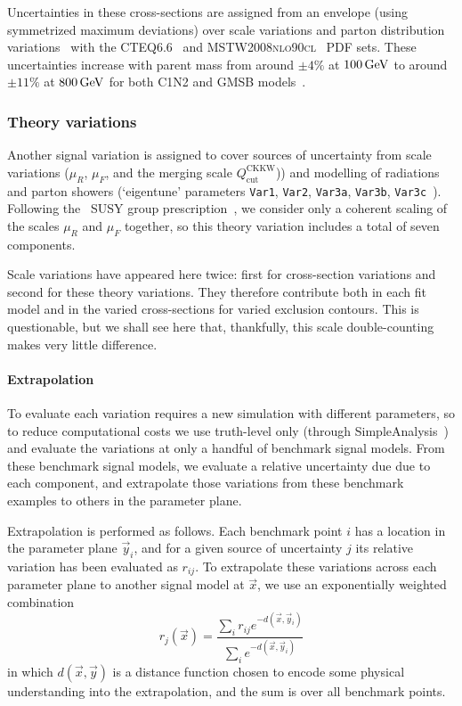 Uncertainties in these cross-sections are assigned from an envelope
(using symmetrized maximum deviations)
over scale variations and parton distribution variations~\cite{Fuks:2012qx}
with the
\textsc{CTEQ6.6}~\cite{Nadolsky:2008cw} and
\textsc{MSTW2008nlo90cl}~\cite{Martin:2009iq} PDF sets.
These uncertainties increase with parent mass from around
$\pm4\%$ at $100\,\eV[G]$ to around
$\pm11\%$ at $800\,\eV[G]$ for both C1N2 and GMSB models~\cite{
atlas_twiki_xsec_c1n2,
atlas_twiki_xsec_hino
}.

\subsubsection{Theory variations}
\label{sec:2ljets_theory_variations}
Another signal variation is assigned to cover sources of uncertainty from
scale variations ($\mu_R$, $\mu_F$, and the merging scale
$Q_\textrm{cut}^\textrm{CKKW}$)) and modelling of radiations and parton
showers (`eigentune' parameters
\texttt{Var1},
\texttt{Var2},
\texttt{Var3a},
\texttt{Var3b},
\texttt{Var3c}~\cite{ATL-PHYS-PUB-2014-021}).
Following the \atlas\ SUSY group
prescription~\cite{atlas_twiki_susytheoretical},
we consider only a coherent scaling of the scales $\mu_R$ and $\mu_F$ together,
so this theory variation includes a total of seven components.

Scale variations have appeared here twice:
first for cross-section variations and
second for these theory variations.
They therefore contribute both in each fit model and in the varied
cross-sections for varied exclusion contours.
This is questionable, but we shall see here that, thankfully, this scale
double-counting makes very little difference.

\paragraph{Extrapolation}
To evaluate each variation requires a new simulation with different parameters,
so to reduce computational costs we use truth-level only
(through SimpleAnalysis~\cite{simpleanalysis_cern}) and evaluate the
variations at only a handful of benchmark signal models.
From these benchmark signal models, we evaluate a relative uncertainty due
due to each component, and extrapolate those variations from these benchmark
examples to others in the parameter plane.

Extrapolation is performed as follows.
Each benchmark point $i$ has a location in the parameter plane $\vec y_i$, and
for a given source of uncertainty $j$ its relative variation has been evaluated
as $r_{ij}$.
To extrapolate these variations across each parameter plane to another signal
model at $\vec x$, we use an exponentially weighted combination
\begin{equation}
\label{eqn:2ljets_signal_extrap}
r_j(\vec x) = \frac{
\sum_i r_{ij} e^{-d(\vec x, \vec y_i)}
}{
\sum_i e^{-d(\vec x, \vec y_i)}
}
\end{equation}
in which $d(\vec x, \vec y)$ is a distance function chosen to encode some
physical understanding into the extrapolation,
and the sum is over all benchmark points.

